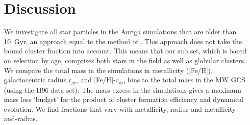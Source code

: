 \documentclass[a4paper,fleqn,usenatbib]{mnras}
\begin{document}
% 
% 
% 
% 






\section{Discussion}
\label{sec:discussion}

We investigate all star particles in the Auriga simulations that are older than 10~Gyr,
an approach equal to the method of \citep{2017MNRAS.465.3622R}. This approach does not
take the bound cluster fraction \citep[e.g.][]{2012MNRAS.426.3008K} into account. This
means that our sub set, which is based on selection by age, comprises both stars in the
field as well as globular clusters. We compare the total mass in the simulations in 
metallicity ([Fe/H]), galactocentric radius $r_{\text{gc}}$, and [Fe/H]-$r_{\text{gal}}$ 
bins to the total mass in the MW GCS (using the H96 data set). The mass excess in the
simulations gives a maximum mass loss `budget' for the product of cluster formation 
efficiency and dynamical evolution. We find fractions that vary with metallicity,
radius and metallicity-and-radius.
\end{document}
